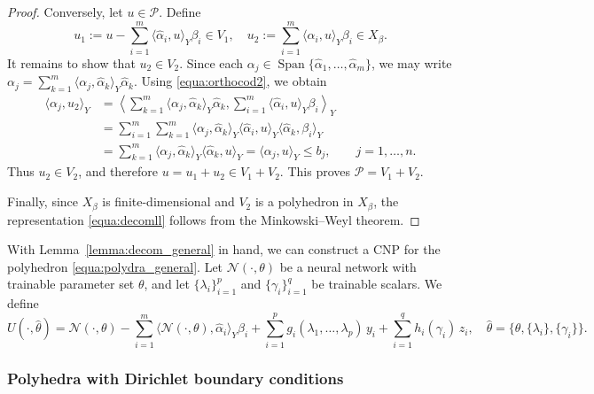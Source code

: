 \documentclass{article}
\numberwithin{equation}{section}
\begin{document}
\begin{proof}
Conversely, let $u\in\mathcal{P}$. Define
\[
u_1:=u-\sum_{i=1}^m \langle \hat{\alpha}_i,u\rangle_Y\beta_i
\in V_1, \quad u_2:=\sum_{i=1}^m \langle \hat{\alpha}_i,u\rangle_Y\beta_i
\in X_\beta.
\]
It remains to show that $u_2\in V_2$. Since each $\alpha_j\in \operatorname{Span}\{\hat{\alpha}_1,\dots,\hat{\alpha}_m\}$, we may write
$\alpha_j=\sum_{k=1}^m \langle \alpha_j,\hat{\alpha}_k\rangle_Y \hat{\alpha}_k.$ Using \eqref{equa:orthocod2}, we obtain
\begin{equation*}
\begin{aligned}
\langle \alpha_j,u_2\rangle_Y
&=
\left\langle
\sum_{k=1}^m \langle \alpha_j,\hat{\alpha}_k\rangle_Y \hat{\alpha}_k,
\sum_{i=1}^m \langle \hat{\alpha}_i,u\rangle_Y \beta_i
\right\rangle_Y \\
&=
\sum_{i=1}^m \sum_{k=1}^m
\langle \alpha_j,\hat{\alpha}_k\rangle_Y
\langle \hat{\alpha}_i,u\rangle_Y
\langle \hat{\alpha}_k,\beta_i\rangle_Y \\
&=
\sum_{k=1}^m \langle \alpha_j,\hat{\alpha}_k\rangle_Y \langle \hat{\alpha}_k,u\rangle_Y
=
\langle \alpha_j,u\rangle_Y
\le b_j,
\qquad j=1,\dots,n.
\end{aligned}
\end{equation*}
Thus $u_2\in V_2$, and therefore $u=u_1+u_2\in V_1+V_2$. This proves $\mathcal{P}=V_1+V_2$.

Finally, since $X_\beta$ is finite-dimensional and $V_2$ is a polyhedron in $X_\beta$, the representation \eqref{equa:decomll} follows from the Minkowski--Weyl theorem.
\end{proof}

With Lemma~\ref{lemma:decom_general} in hand, we can construct a CNP for the polyhedron \eqref{equa:polydra_general}. Let $\mathcal{N}(\cdot,\theta)$ be a neural network with trainable parameter set $\theta$, and let $\{\lambda_i\}_{i=1}^p$ and $\{\gamma_i\}_{i=1}^q$ be trainable scalars. We define
\begin{equation}
    U(\cdot,\hat{\theta})
    =
    \mathcal{N}(\cdot,\theta)
    -
    \sum_{i=1}^m \langle \mathcal{N}(\cdot,\theta),\hat{\alpha}_i\rangle_Y \beta_i
    +
    \sum_{i=1}^p g_i(\lambda_1,\dots,\lambda_p)\,y_i
    +
    \sum_{i=1}^q h_i(\gamma_i)\,z_i, \quad \hat{\theta} = \{\theta, \{\lambda_i\},\{\gamma_i\}\}.
\end{equation}

\subsubsection{Polyhedra with Dirichlet boundary conditions}\label{sec:poly_boundary}
\end{document}
